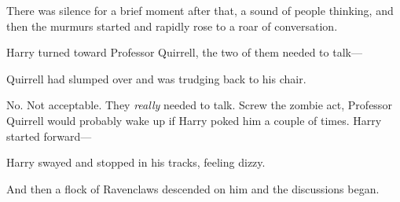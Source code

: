 There was silence for a brief moment after that, a sound of people thinking, and then the murmurs started and rapidly rose to a roar of conversation.

Harry turned toward Professor Quirrell, the two of them needed to talk—

Quirrell had slumped over and was trudging back to his chair.

No. Not acceptable. They \emph{really} needed to talk. Screw the zombie act, Professor Quirrell would probably wake up if Harry poked him a couple of times. Harry started forward—


Harry swayed and stopped in his tracks, feeling dizzy.

And then a flock of Ravenclaws descended on him and the discussions began.


